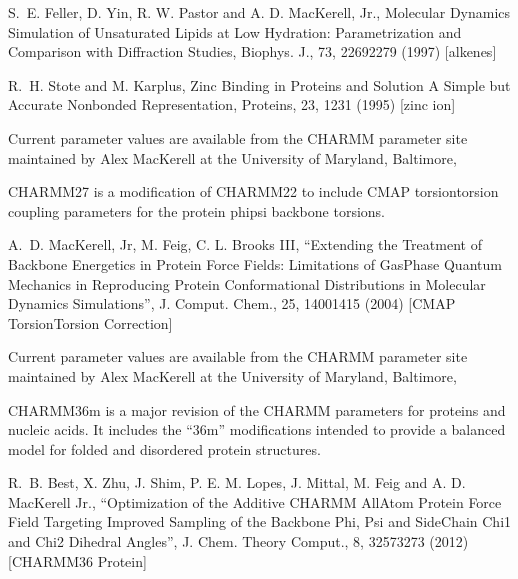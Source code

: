 \documentclass[letterpaper,11pt,english]{sphinxmanual}
\begin{document}
\sphinxAtStartPar
S. E. Feller, D. Yin, R. W. Pastor and A. D. MacKerell, Jr., Molecular Dynamics Simulation of Unsaturated Lipids at Low Hydration: Parametrization and Comparison with Diffraction Studies, Biophys. J., 73, 2269\sphinxhyphen{}2279 (1997)  {[}alkenes{]}

\sphinxAtStartPar
R. H. Stote and M. Karplus, Zinc Binding in Proteins and Solution \sphinxhyphen{} A Simple but Accurate Nonbonded Representation, Proteins, 23, 12\sphinxhyphen{}31 (1995)  {[}zinc ion{]}

\sphinxAtStartPar
Current parameter values are available from the CHARMM parameter site maintained by Alex MacKerell at the University of Maryland, Baltimore, 

\sphinxAtStartPar
{}

\sphinxAtStartPar
CHARMM27 is a modification of CHARMM22 to include CMAP torsion\sphinxhyphen{}torsion coupling parameters for the protein phi\sphinxhyphen{}psi backbone torsions.

\sphinxAtStartPar
A. D. MacKerell, Jr, M. Feig, C. L. Brooks III, “Extending the Treatment of Backbone Energetics in Protein Force Fields: Limitations of Gas\sphinxhyphen{}Phase Quantum Mechanics in Reproducing Protein Conformational Distributions in Molecular Dynamics Simulations”, J. Comput. Chem., 25, 1400\sphinxhyphen{}1415 (2004)  {[}CMAP Torsion\sphinxhyphen{}Torsion Correction{]}

\sphinxAtStartPar
Current parameter values are available from the CHARMM parameter site maintained by Alex MacKerell at the University of Maryland, Baltimore, 

\sphinxAtStartPar
{}

\sphinxAtStartPar
CHARMM36m is a major revision of the CHARMM parameters for proteins and nucleic acids. It includes the “36m” modifications intended to provide a balanced model for folded and disordered protein structures.

\sphinxAtStartPar
R. B. Best, X. Zhu, J. Shim, P. E. M. Lopes, J. Mittal, M. Feig and A. D. MacKerell Jr., “Optimization of the Additive CHARMM All\sphinxhyphen{}Atom Protein Force Field Targeting Improved Sampling of the Backbone Phi, Psi and Side\sphinxhyphen{}Chain Chi1 and Chi2 Dihedral Angles”, J. Chem. Theory Comput., 8, 3257\sphinxhyphen{}3273 (2012)  {[}CHARMM36 Protein{]}
\end{document}
